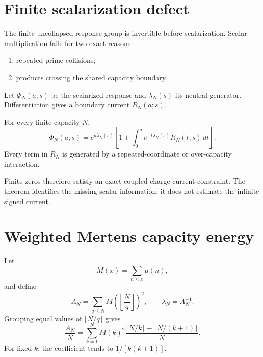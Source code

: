 \documentclass[11pt,a4paper]{article}
\begin{document}
\section{Finite scalarization defect}
The finite uncollapsed response group is invertible before scalarization. Scalar multiplication fails for two exact reasons:
\begin{enumerate}
\item repeated-prime collisions;
\item products crossing the shared capacity boundary.
\end{enumerate}
Let $\Phi_N(a;s)$ be the scalarized response and $\lambda_N(s)$ its neutral generator. Differentiation gives a boundary current $R_N(a;s)$.
\begin{theorem}
For every finite capacity $N$,
\begin{equation}
\boxed{\Phi_N(a;s)=e^{a\lambda_N(s)}\left[1+\int_0^ae^{-t\lambda_N(s)}R_N(t;s)\,dt\right].}
\end{equation}
Every term in $R_N$ is generated by a repeated-coordinate or over-capacity interaction.
\end{theorem}
Finite zeros therefore satisfy an exact coupled charge-current constraint. The theorem identifies the missing scalar information; it does not estimate the infinite signed current.

\section{Weighted Mertens capacity energy}
Let
\begin{equation}
M(x)=\sum_{n\le x}\mu(n),
\end{equation}
and define
\begin{equation}
A_N=\sum_{q\le N}M\!\left(\left\lfloor\frac Nq\right\rfloor\right)^2,
\qquad \lambda_N=A_N^{-1}.
\end{equation}
Grouping equal values of $\lfloor N/q\rfloor$ gives
\begin{equation}
\frac{A_N}{N}=\sum_{k=1}^NM(k)^2
\frac{\lfloor N/k\rfloor-\lfloor N/(k+1)\rfloor}{N}.
\end{equation}
For fixed $k$, the coefficient tends to $1/[k(k+1)]$.
\end{document}
